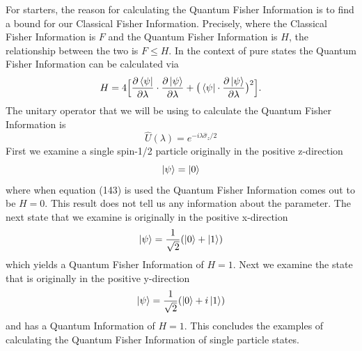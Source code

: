 \documentclass[twocolumn]{article}
\begin{document}
For starters, the reason for calculating the Quantum Fisher Information is to find a bound for our Classical Fisher Information. Precisely, where the Classical Fisher Information is $F$ and the Quantum Fisher Information is $H$, the relationship between the two is $F\leq H$. In the context of pure states the Quantum Fisher Information can be calculated via
\begin{equation}
H=4\Big[\frac{\partial\bra{\psi}}{\partial\lambda}\cdot\frac{\partial\ket{\psi}}{\partial\lambda}+\big(\bra{\psi}\cdot\frac{\partial\ket{\psi}}{\partial\lambda}\big)^2\Big].
\end{equation}
The unitary operator that we will be using to calculate the Quantum Fisher Information is
\begin{equation}
\hat{U}(\lambda)=e^{-i\lambda\hat{\sigma}_z/2}
\end{equation}
First we examine a single spin-1/2 particle originally in the positive z-direction
\begin{equation}
\ket{\psi}=\ket{0}
\end{equation}
where when equation (143) is used the Quantum Fisher Information comes out to be $H=0$. This result does not tell us any information about the parameter. The next state that we examine is originally in the positive x-direction
\begin{equation}
\ket{\psi}=\frac{1}{\sqrt{2}}(\ket{0}+\ket{1})
\end{equation}
which yields a Quantum Fisher Information of $H=1$. Next we examine the state that is originally in the positive y-direction
\begin{equation}
\ket{\psi}=\frac{1}{\sqrt{2}}(\ket{0}+i\ket{1})
\end{equation}
and has a Quantum Information of $H=1$. This concludes the examples of calculating the Quantum Fisher Information of single particle states.
\end{document}
